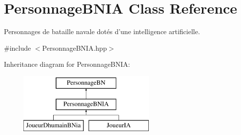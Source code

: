 \hypertarget{classPersonnageBNIA}{\section{Personnage\-B\-N\-I\-A Class Reference}
\label{classPersonnageBNIA}
}


Personnages de bataille navale dotés d'une intelligence artificielle.  




{\ttfamily \#include $<$Personnage\-B\-N\-I\-A.\-hpp$>$}

Inheritance diagram for Personnage\-B\-N\-I\-A\-:\begin{figure}[H]
\begin{center}
\leavevmode
\includegraphics[height=3.000000cm]{classPersonnageBNIA}
\end{center}
\end{figure}
